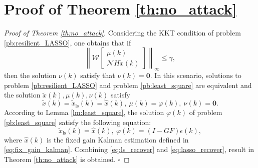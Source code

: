 \documentclass[12pt]{article}  %
\newcommand{\Nc}{{\mathcal{N}}}
\newcommand{\Wc}{{\mathcal{W}}}
\newcommand{\ift}{{\infty}}
\newcommand{\ls}{\text{ls}}
\newtheorem*{proof}{\textbf{Proof}}
\begin{document}
\section{Proof of Theorem \ref{th:no_attack}}\label{ap:ap_no_attack}
\begin{proof}[Proof of Theorem \ref{th:no_attack}]
	
	Considering the KKT condition of problem \eqref{pb:resilient_LASSO}, one obtains that if 
	$$\left\|\Wc \begin{bmatrix}
	\mu(k) \\
	\Nc H \tilde{x}(k)
	\end{bmatrix}\right\|_\ift\leq\gamma,$$ then the solution $\nu(k)$ satisfy that $\nu(k)=\mathbf{0}$. In this scenario, solutions to problem \eqref{pb:resilient_LASSO} and problem \eqref{pb:least_square} are equivalent and the solution $\tilde{x}(k),\mu(k),\nu(k)$ satisfy
	\begin{equation}\label{eq:lasso_recover}
	\tilde{x}(k)=\tilde{x}_\ls(k)=\hat{x}(k),\ \mu(k)=\varphi(k),\ \nu(k)=\mathbf{0}.
	\end{equation}
	According to Lemma \ref{lm:least_square}, the solution $\varphi(k)$ of problem \eqref{pb:least_square} satisfy the following equation:
	\begin{equation}\label{eq:ls_recover}
	\tilde{x}_\ls(k)=\hat{x}(k),\ \varphi(k)=(I-GF)\epsilon(k),
	\end{equation}
	where $\hat{x}(k)$ is the fixed gain Kalman estimation defined in \eqref{eq:fix_gain_kalman}.
	Combining \eqref{eq:ls_recover} and \eqref{eq:lasso_recover}, result in Theorem \ref{th:no_attack} is obtained. $\square$
\end{proof}
\end{document}
